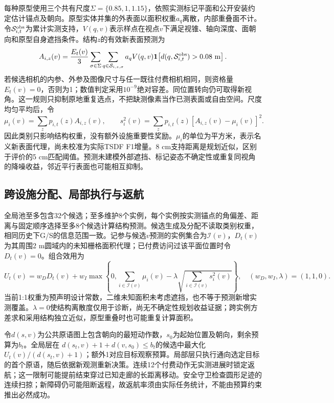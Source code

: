 每种原型使用三个共有尺度$\Sigma=\{0.85,1,1.15\}$，依照实测标记平面和公开安装约定估计锚点及朝向。原型实体并集的外表面以面积权重$a_q$离散，内部重叠面不计。令$\mathcal S_{i,t}^{\rm obs}$为累计实测支持，$V(q,v)$表示样点在视点$v$下满足视锥、轴向深度、面朝向和原型自身遮挡条件。结构$z$的有效新表面预测为
\begin{equation}
 A_{i,z}(v)=\frac{E_t(v)}{3}\sum_{\sigma\in\Sigma}
 \sum_{q\in\mathcal S_{i,z,\sigma}}a_qV(q,v)
 \mathbf 1\!\left[d(q,\mathcal S_{i,t}^{\rm obs})>0.08\ \mathrm m\right].
 \label{eq:extension-area}
\end{equation}
若候选相机的内参、外参及图像尺寸与任一既往付费相机相同，则资格量$E_t(v)=0$，否则为1；数值判定采用$10^{-9}$绝对容差。同位置转向仍可取得新视角。这一规则只抑制原地重复选点，不把缺测像素当作已测表面或自由空间。尺度均匀平均后，令
\begin{equation}
 \mu_i(v)=\sum_zp_{i,t}(z)A_{i,z}(v),\qquad
 s_i^2(v)=\sum_zp_{i,t}(z)[A_{i,z}(v)-\mu_i(v)]^2.
 \label{eq:extension-moments}
\end{equation}
因此类别只影响结构权重，没有额外设施重要性奖励。$\mu_i$的单位为平方米，表示名义新表面代理，尚未校准为实际TSDF F1增量。8 cm支持距离是规划近似，区别于评价的5 cm匹配阈值。预测未建模外部遮挡、标记姿态不确定性或重复同视角的降噪收益，邻近平行表面也可能相互抑制。

\subsection{跨设施分配、局部执行与返航}
全局池至多包含32个候选；至多维护8个实例，每个实例按实测锚点的角偏差、距离与固定顺序选择至多8个候选计算结构预测。候选生成及分配不读取类别权重，相同历史下G/S的信息范围一致。记参与候选$v$预测的实例集合为$\mathcal I(v)$，$D_t(v)$为其周围2 m圆域内的未知栅格面积代理；已付费访问过该平面位置时令$D_t(v)=0$。组合效用为
\begin{equation}
 U_t(v)=w_DD_t(v)+w_I\max\!\left\{0,
 \sum_{i\in\mathcal I(v)}\mu_i(v)
 -\lambda\sqrt{\sum_{i\in\mathcal I(v)}s_i^2(v)}\right\},
 \quad(w_D,w_I,\lambda)=(1,1,0).
 \label{eq:extension-utility}
\end{equation}
当前1:1权重为预声明设计常数，二维未知面积未考虑遮挡，也不等于预测新增实测覆盖。$\lambda=0$使结构离散度仅用于诊断，尚无不确定性规划收益证据；跨实例方差求和采用结构独立近似，原型重叠时也可能重复计算面积。

令$d(s,v)$为公共原语图上包含朝向的最短动作数，$s_0$为起始位置及朝向，剩余预算为$b_t$。全局层在
$d(s_t,v)+1+d(v,s_0)\le b_t$的候选中最大化$U_t(v)/(d(s_t,v)+1)$；额外1对应目标观察预算。局部层只执行通向选定目标的首个原语，随后依据新观测重新决策。连续12个付费动作无实测进展时锁定返航；这一限制可能提前结束穿过已知走廊的长距离移动。安全守卫检查圆形足迹的连续扫掠；新障碍仍可能阻断返程，故返航率须由实际任务统计，不能由预算约束推出必然成功。

